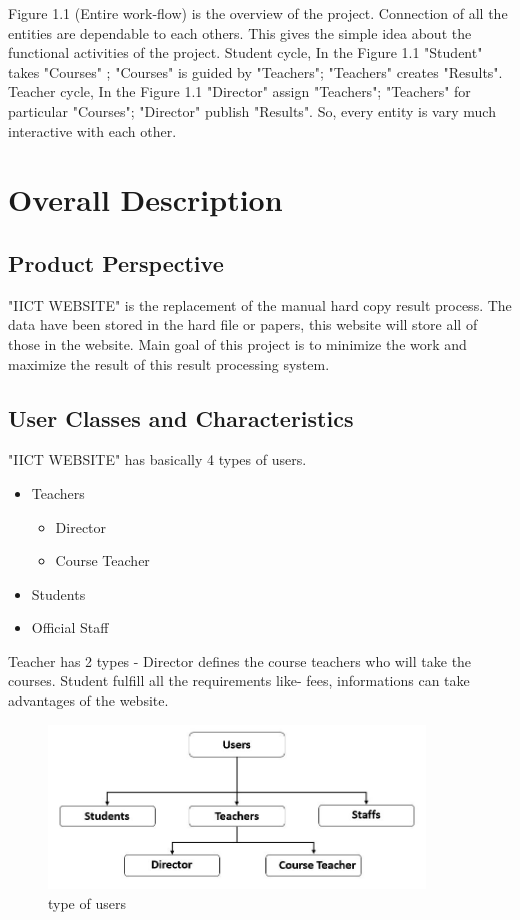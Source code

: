 \documentclass{scrreprt}
\begin{document}
	\newline
	Figure 1.1 (Entire work-flow) is the overview of the project. Connection of all the entities are dependable to each others.  This gives the simple idea about the functional activities of the project. 
	\newline
	Student cycle, In the Figure 1.1 "Student" takes "Courses" ; "Courses" is guided by "Teachers"; "Teachers" creates "Results". 
	\newline
	Teacher cycle, In the Figure 1.1 "Director" assign "Teachers"; "Teachers" for particular "Courses"; "Director" publish "Results".
	\newline
	So, every entity is vary much interactive with each other.
	
	
	\chapter{Overall Description}
	
	\section{Product Perspective}
	"IICT WEBSITE" is the replacement of the manual hard copy result process. The data have been stored in the hard file or papers, this website will store all of those in the website. Main goal of this project is to minimize the work and maximize the result of this result processing system.
	
	\section{User Classes and Characteristics}
	"IICT WEBSITE" has basically 4 types of users. 
	\begin{itemize}
		\item Teachers
		\begin{itemize}
			\item Director
			\item Course Teacher
		\end{itemize}
		\item Students
		\item Official Staff
	\end{itemize}
	Teacher has 2 types - Director defines the course teachers who will take the courses. Student fulfill all the requirements like- fees, informations can take advantages of the website. 
	\begin{figure}
		\centering
		\includegraphics[width=10cm]{2.JPG}
		\caption{type of users}
		\label{fig:type of users}
	\end{figure}
	
\end{document}
